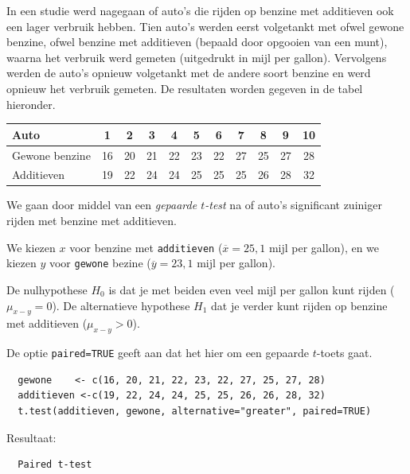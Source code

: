 \begin{example}
  In een studie werd nagegaan of auto's die rijden op benzine met additieven ook een lager verbruik hebben. Tien auto's werden eerst volgetankt met ofwel gewone benzine, ofwel benzine met additieven (bepaald door opgooien van een munt), waarna het verbruik werd gemeten (uitgedrukt in mijl per gallon). Vervolgens werden de auto's opnieuw volgetankt met de andere soort benzine en werd opnieuw het verbruik gemeten. De resultaten worden gegeven in de tabel hieronder.
  
  \begin{center}
    \begin{tabular}{|l|c|c|c|c|c|c|c|c|c|c|}
      \hline 
      Auto & 1 & 2 & 3 & 4 & 5 & 6 & 7 & 8 & 9 & 10 \\ 
      \hline 
      Gewone benzine & 16 & 20 & 21 & 22 & 23 & 22 & 27 & 25 & 27 & 28 \\ 
      \hline 
      Additieven & 19 & 22 & 24 & 24 & 25 & 25 & 25 & 26 & 28 & 32 \\ 
      \hline 
    \end{tabular} 
  \end{center}
  
  We gaan door middel van een \emph{gepaarde $t$-test} na of auto's significant zuiniger rijden met benzine met additieven.
  
  We kiezen $x$ voor benzine met \texttt{additieven} ($\overline{x}=25,1$ mijl per gallon), en we kiezen $y$ voor \texttt{gewone} bezine ($\overline{y}=23,1$ mijl per gallon).
  
  De nulhypothese $H_0$ is dat je met beiden even veel mijl per gallon kunt rijden ($\mu_{x-y}=0$).
  De alternatieve hypothese $H_1$ dat je verder kunt rijden op benzine met additieven ($\mu_{x-y}>0$).
  
  De optie \texttt{paired=TRUE} geeft aan dat het hier om een gepaarde $t$-toets gaat.
  
  \begin{lstlisting}
  gewone    <- c(16, 20, 21, 22, 23, 22, 27, 25, 27, 28)
  additieven <-c(19, 22, 24, 24, 25, 25, 26, 26, 28, 32)
  t.test(additieven, gewone, alternative="greater", paired=TRUE)
  \end{lstlisting}
  
  Resultaat:
  
  \begin{verbatim}
  Paired t-test
  

\end{verbatim}
\end{example}
